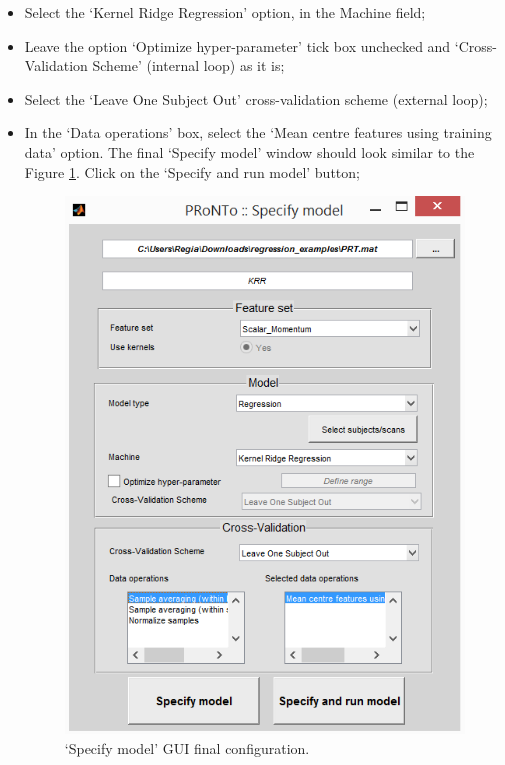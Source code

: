\begin{itemize}
     \item Select the `Kernel Ridge Regression' option, in the Machine field;
     
	 \item Leave the option `Optimize hyper-parameter' tick box unchecked and `Cross-Validation Scheme' (internal loop) as it is; 
	
	\item Select the `Leave One Subject Out' cross-validation scheme (external loop);
	
	\item In the `Data operations' box, select the `Mean centre features using training data' option. The final `Specify model' window should look similar to the Figure \ref{fig:specifyModelFinal}. Click on the `Specify and run model' button;
	     

        \begin{figure}[h!]
            \begin{center}
                \includegraphics[scale=0.75]{images/Tutorial/regression/specifyModelFinal.png}
            \end{center}
            \caption{`Specify model' GUI final configuration.}
            \label{fig:specifyModelFinal}
        \end{figure}


\end{itemize}
